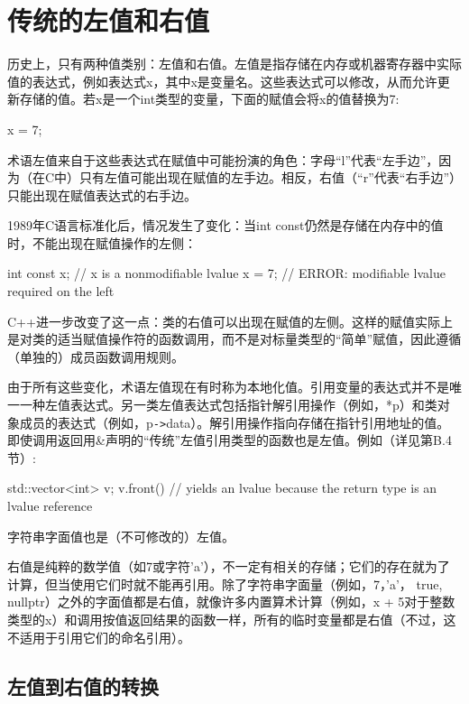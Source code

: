 \section{传统的左值和右值}

历史上，只有两种值类别：左值和右值。左值是指存储在内存或机器寄存器中实际值的表达式，例如表达式x，其中x是变量名。这些表达式可以修改，从而允许更新存储的值。若x是一个int类型的变量，下面的赋值会将x的值替换为7:

\begin{cpp}
x = 7;
\end{cpp}

术语左值来自于这些表达式在赋值中可能扮演的角色：字母“l”代表“左手边”，因为（在C中）只有左值可能出现在赋值的左手边。相反，右值（“r”代表“右手边”）只能出现在赋值表达式的右手边。

1989年C语言标准化后，情况发生了变化：当int const仍然是存储在内存中的值时，不能出现在赋值操作的左侧：

\begin{cpp}
int const x; // x is a nonmodifiable lvalue
x = 7; // ERROR: modifiable lvalue required on the left
\end{cpp}

C++进一步改变了这一点：类的右值可以出现在赋值的左侧。这样的赋值实际上是对类的适当赋值操作符的函数调用，而不是对标量类型的“简单”赋值，因此遵循（单独的）成员函数调用规则。

由于所有这些变化，术语左值现在有时称为本地化值。引用变量的表达式并不是唯一一种左值表达式。另一类左值表达式包括指针解引用操作（例如，*p）和类对象成员的表达式（例如，p\texttt{->}data）。解引用操作指向存储在指针引用地址的值。即使调用返回用\&声明的“传统”左值引用类型的函数也是左值。例如（详见第B.4节）:

\begin{cpp}
std::vector<int> v;
v.front() // yields an lvalue because the return type is an lvalue reference
\end{cpp}

字符串字面值也是（不可修改的）左值。

右值是纯粹的数学值（如7或字符'a'），不一定有相关的存储；它们的存在就为了计算，但当使用它们时就不能再引用。除了字符串字面量（例如，7，'a'， true, nullptr）之外的字面值都是右值，就像许多内置算术计算（例如，x + 5对于整数类型的x）和调用按值返回结果的函数一样，所有的临时变量都是右值（不过，这不适用于引用它们的命名引用）。

\subsection{左值到右值的转换}

